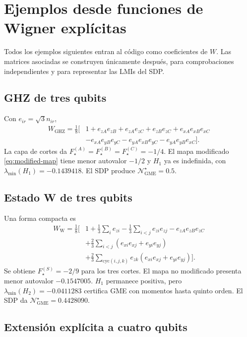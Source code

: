 \documentclass[11pt,a4paper]{article}
\newcommand{\Fstar}{F_{\star}}
\newcommand{\Ngstar}{\mathcal N_{\mathrm{GME}}^{\star}}
\theoremstyle{definition}
\begin{document}
\section{Ejemplos desde funciones de Wigner explícitas}

Todos los ejemplos siguientes entran al código como coeficientes de $W$. Las
matrices asociadas se construyen únicamente después, para comprobaciones
independientes y para representar las LMIs del SDP.

\subsection{GHZ de tres qubits}

Con $e_{ir}=\sqrt3 n_{ir}$,
\begin{align}
 W_{\mathrm{GHZ}}=\frac18\bigl[&1+e_{zA}e_{zB}+e_{zA}e_{zC}+e_{zB}e_{zC}
 +e_{xA}e_{xB}e_{xC}\nonumber\\
 &-e_{xA}e_{yB}e_{yC}-e_{yA}e_{xB}e_{yC}
 -e_{yA}e_{yB}e_{xC}\bigr].
 \label{eq:W-GHZ}
\end{align}
La capa de cortes da $\Fstar^{(A)}=\Fstar^{(B)}=\Fstar^{(C)}=-1/4$.
El mapa modificado \eqref{eq:modified-map} tiene menor autovalor $-1/2$ y
$H_1$ ya es indefinida, con $\lambda_{\min}(H_1)=-0.1439418$. El SDP produce
$\Ngstar=0.5$.

\subsection{Estado W de tres qubits}

Una forma compacta es
\begin{align}
 W_{\mathrm W}=\frac18\bigg[&1+\frac13\sum_i e_{zi}
 -\frac13\sum_{i<j}e_{zi}e_{zj}-e_{zA}e_{zB}e_{zC}\nonumber\\
 &+\frac23\sum_{i<j}(e_{xi}e_{xj}+e_{yi}e_{yj})\nonumber\\
 &+\frac23\sum_{\mathrm{cyc}(i,j,k)}e_{zk}
 (e_{xi}e_{xj}+e_{yi}e_{yj})\bigg].
 \label{eq:W-W}
\end{align}
Se obtiene $\Fstar^{(S)}=-2/9$ para los tres cortes. El mapa no modificado
presenta menor autovalor $-0.1547005$. $H_1$ permanece positiva, pero
$\lambda_{\min}(H_2)=-0.0411283$ certifica GME con momentos hasta quinto orden.
El SDP da $\Ngstar=0.4428090$.

\subsection{Extensión explícita a cuatro qubits}
\end{document}
